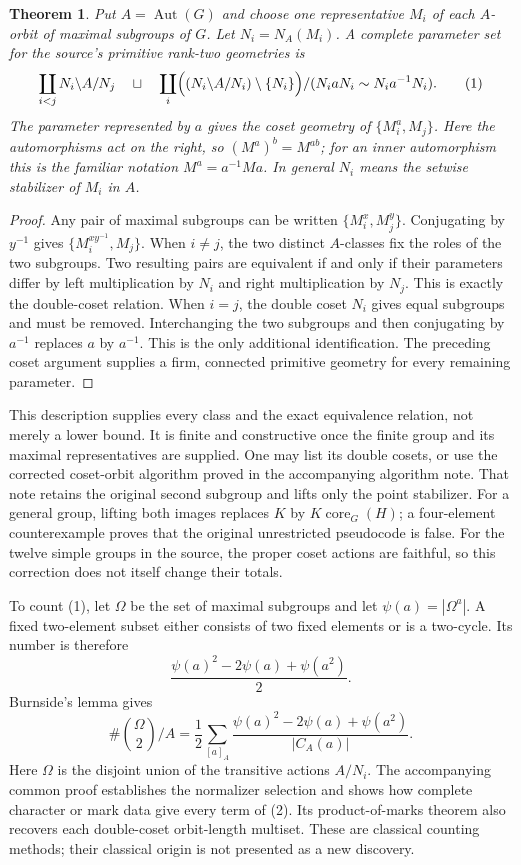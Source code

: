 \documentclass[11pt]{article}
\newtheorem{theorem}{Theorem}\newtheorem{lemma}[theorem]{Lemma}
\newcommand{\Aut}{\operatorname{Aut}}
\begin{document}
\begin{theorem}\label{param}
Put $A=\Aut(G)$ and choose one representative $M_i$ of each $A$-orbit of
maximal subgroups of $G$. Let $N_i=N_A(M_i)$. A complete parameter set for
the source's primitive rank-two geometries is
\[
\coprod_{i<j}N_i\backslash A/N_j\quad\sqcup\quad
\coprod_i\Bigl((N_i\backslash A/N_i)\setminus\{N_i\}\Bigr)
                       /(N_i a N_i\sim N_i a^{-1}N_i).
\tag{1}
\]
The parameter represented by $a$ gives the coset geometry of
$\{M_i^a,M_j\}$. Here the automorphisms act on the right, so
$(M^a)^b=M^{ab}$; for an inner automorphism this is the familiar
notation $M^a=a^{-1}Ma$. In general $N_i$ means the setwise stabilizer
of $M_i$ in $A$.
\end{theorem}
\begin{proof}
Any pair of maximal subgroups can be written
$\{M_i^x,M_j^y\}$. Conjugating by $y^{-1}$ gives
$\{M_i^{xy^{-1}},M_j\}$. When $i\ne j$, the two distinct $A$-classes fix
the roles of the two subgroups. Two resulting pairs are equivalent if and
only if their parameters differ by left multiplication by $N_i$ and right
multiplication by $N_j$. This is exactly the double-coset relation.
When $i=j$, the double coset $N_i$ gives equal subgroups and must be
removed. Interchanging the two subgroups and then conjugating by $a^{-1}$
replaces $a$ by $a^{-1}$. This is the only additional identification.
The preceding coset argument supplies a firm, connected primitive geometry
for every remaining parameter.
\end{proof}

This description supplies every class and the exact equivalence relation,
not merely a lower bound. It is finite and constructive once the finite
group and its maximal representatives are supplied. One may list its
double cosets, or use the corrected coset-orbit algorithm proved in the
accompanying algorithm note. That note retains the original second
subgroup and lifts only the point stabilizer. For a general group, lifting
both images replaces $K$ by $K\operatorname{core}_G(H)$; a four-element
counterexample proves that the original unrestricted pseudocode is false.
For the twelve simple groups in the source, the proper coset actions are
faithful, so this correction does not itself change their totals.

To count (1), let $\Omega$ be the set of maximal subgroups and let
$\psi(a)=|\Omega^a|$. A fixed two-element subset either consists of two
fixed elements or is a two-cycle. Its number is therefore
\[
\frac{\psi(a)^2-2\psi(a)+\psi(a^2)}2.
\]
Burnside's lemma gives
\[
\#\binom{\Omega}{2}/A=
 \frac12\sum_{[a]_A}
 \frac{\psi(a)^2-2\psi(a)+\psi(a^2)}{|C_A(a)|}.             \tag{2}
\]
Here $\Omega$ is the disjoint union of the transitive actions $A/N_i$.
The accompanying common proof establishes the normalizer selection and
shows how complete character or mark data give every term of (2).
Its product-of-marks theorem also recovers each double-coset orbit-length
multiset. These are classical counting methods; their classical origin is
not presented as a new discovery.
\end{document}
